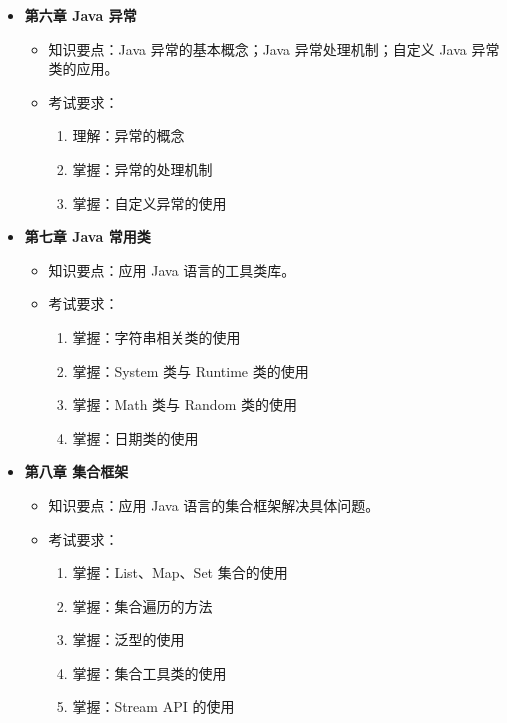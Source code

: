 \documentclass{../note}
\begin{document}
\begin{itemize}
  \item \textbf{第六章 Java 异常}
    \begin{itemize}
      \item 知识要点：Java 异常的基本概念；Java 异常处理机制；自定义 Java 异常类的应用。
      \item 考试要求：
        \begin{enumerate}
          \item 理解：异常的概念
          \item 掌握：异常的处理机制
          \item 掌握：自定义异常的使用
        \end{enumerate}
    \end{itemize}

  \item \textbf{第七章 Java 常用类}
    \begin{itemize}
      \item 知识要点：应用 Java 语言的工具类库。
      \item 考试要求：
        \begin{enumerate}
          \item 掌握：字符串相关类的使用
          \item 掌握：System 类与 Runtime 类的使用
          \item 掌握：Math 类与 Random 类的使用
          \item 掌握：日期类的使用
        \end{enumerate}
    \end{itemize}

  \item \textbf{第八章 集合框架}
    \begin{itemize}
      \item 知识要点：应用 Java 语言的集合框架解决具体问题。
      \item 考试要求：
        \begin{enumerate}
          \item 掌握：List、Map、Set 集合的使用
          \item 掌握：集合遍历的方法
          \item 掌握：泛型的使用
          \item 掌握：集合工具类的使用
          \item 掌握：Stream API 的使用
        \end{enumerate}
    \end{itemize}


\end{itemize}
\end{document}

